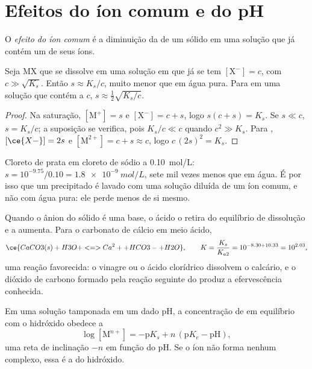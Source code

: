 \section{Efeitos do íon comum e do pH}

\begin{definition}\label{def:b1:precipitation:common-ion}
O \emph{efeito do íon comum} é a diminuição
da  de um sólido em uma solução que já contém um de seus
íons.
\end{definition}

\begin{proposition}\label{prop:b1:precipitation:common-ion}
Seja MX que se dissolve em uma solução em que já se tem
$[\mathrm{X}^-] = c$, com $c \gg \sqrt{K_s}$. Então $s \approx K_s/c$,
muito menor que em água pura. Para  em uma solução que contém
 a $c$,
$s \approx \frac12\sqrt{K_s/c}$.
\end{proposition}

\begin{proof}
Na saturação, $[\mathrm{M}^+] = s$ e $[\mathrm{X}^-] = c + s$, logo
$s(c + s) = K_s$. Se $s \ll c$, $s = K_s/c$; a suposição se verifica, pois
$K_s/c \ll c$ quando $c^2 \gg K_s$. Para , $[\ce{X-}] = 2s$ e
$[\mathrm{M}^{2+}] = c + s \approx c$, logo $c\,(2s)^2 = K_s$.
\end{proof}

Cloreto de prata em cloreto de sódio a \qty{0.10}{mol/L}: $s = 10^{-9.75}/0.10
= \qty{1.8e-9}{mol/L}$, sete mil vezes menos que em água. É por isso que
um precipitado é lavado com uma solução diluída de um íon comum, e não
com água pura: ele perde menos de si mesmo.

Quando o ânion do sólido é uma base, o ácido o retira do equilíbrio de
dissolução e a  aumenta. Para o carbonato de cálcio em meio
ácido,
\[
  \ce{CaCO3(s) + H3O+ <=> Ca^2+ + HCO3- + H2O}, \qquad
  K = \frac{K_s}{K_{a2}} = 10^{-8.30 + 10.33} = 10^{2.03} ,
\]
uma reação favorecida: o vinagre ou o ácido clorídrico dissolvem o
calcário, e o dióxido de carbono formado pela reação seguinte do
 produz a efervescência conhecida.

\begin{proposition}\label{prop:b1:precipitation:hydroxide-ph}
Em uma solução tamponada em um dado pH, a concentração de  em
equilíbrio com o hidróxido  obedece a
\[
  \log[\mathrm{M}^{n+}] = -\mathrm{p}K_s + n\,(\mathrm{p}K_e - \mathrm{pH}) ,
\]
uma reta de inclinação $-n$ em função do pH. Se o íon não forma nenhum
complexo, essa é a  do hidróxido.
\end{proposition}

